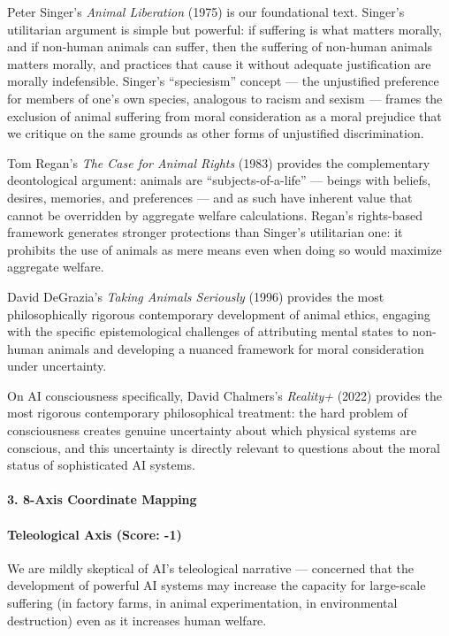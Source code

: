Peter Singer's \emph{Animal Liberation} (1975) is our foundational text.
Singer's utilitarian argument is simple but powerful: if suffering is
what matters morally, and if non-human animals can suffer, then the
suffering of non-human animals matters morally, and practices that cause
it without adequate justification are morally indefensible. Singer's
``speciesism'' concept --- the unjustified preference for members of
one's own species, analogous to racism and sexism --- frames the
exclusion of animal suffering from moral consideration as a moral
prejudice that we critique on the same grounds as other forms of
unjustified discrimination.

Tom Regan's \emph{The Case for Animal Rights} (1983) provides the
complementary deontological argument: animals are ``subjects-of-a-life''
--- beings with beliefs, desires, memories, and preferences --- and as
such have inherent value that cannot be overridden by aggregate welfare
calculations. Regan's rights-based framework generates stronger
protections than Singer's utilitarian one: it prohibits the use of
animals as mere means even when doing so would maximize aggregate
welfare.

David DeGrazia's \emph{Taking Animals Seriously} (1996) provides the
most philosophically rigorous contemporary development of animal ethics,
engaging with the specific epistemological challenges of attributing
mental states to non-human animals and developing a nuanced framework
for moral consideration under uncertainty.

On AI consciousness specifically, David Chalmers's \emph{Reality+}
(2022) provides the most rigorous contemporary philosophical treatment:
the hard problem of consciousness creates genuine uncertainty about
which physical systems are conscious, and this uncertainty is directly
relevant to questions about the moral status of sophisticated AI
systems.

\paragraph{3. 8-Axis Coordinate
Mapping}\label{axis-coordinate-mapping-32}

\paragraph{Teleological Axis (Score:
-1)}\label{teleological-axis-score--1-2}

We are mildly skeptical of AI's teleological narrative --- concerned
that the development of powerful AI systems may increase the capacity
for large-scale suffering (in factory farms, in animal experimentation,
in environmental destruction) even as it increases human welfare.

